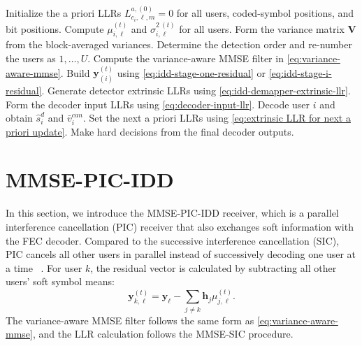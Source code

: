 \begin{algorithm}[t]
\caption{MMSE-SIC-IDD receiver for one coded block}
\label{alg:mmse-sic-idd}
\begin{algorithmic}[1]
\STATE Initialize the a priori LLRs $L^{a,(0)}_{c_i,\ell,m}=0$ for all users, coded-symbol positions, and bit positions.
    \STATE Compute $\mu^{(t)}_{i,\ell}$ and $\sigma^{2~(t)}_{i,\ell}$ for all users.
    \STATE Form the variance matrix $\bm{V}$ from the block-averaged variances.
    \STATE Determine the detection order and re-number the users as $1,\ldots,U$.
        \STATE Compute the variance-aware MMSE filter in \eqref{eq:variance-aware-mmse}.
        \STATE Build $\bm{y}^{(t)}_{(i)}$ using \eqref{eq:idd-stage-one-residual} or \eqref{eq:idd-stage-i-residual}.
        \STATE Generate detector extrinsic LLRs using \eqref{eq:idd-demapper-extrinsic-llr}.
        \STATE Form the decoder input LLRs using \eqref{eq:decoder-input-llr}.
        \STATE Decode user $i$ and obtain $\hat{s}^{d}_{i}$ and $\bar{v}_i^{can}$.
    \ENDFOR
    \STATE Set the next a priori LLRs using \eqref{eq:extrinsic LLR for next a priori update}.
\ENDFOR
\STATE Make hard decisions from the final decoder outputs.
\end{algorithmic}
\end{algorithm}


\section{MMSE-PIC-IDD}
In this section, we introduce the MMSE-PIC-IDD receiver, which is a parallel interference cancellation (PIC) receiver that also exchanges soft information with the FEC decoder.
Compared to the successive interference cancellation (SIC), PIC cancels all other users in parallel instead of successively decoding one user at a time ~\cite{studer2011asic}. For user $k$, the residual vector is calculated by subtracting all other users' soft symbol means: 
\begin{equation}
    \bm{y}^{(t)}_{k,\ell}
    =
    \bm{y}_\ell
    -
    \sum_{j\ne k}\bm{h}_j\mu^{(t)}_{j,\ell}.
    \label{eq:pic-residual}
\end{equation}
The variance-aware MMSE filter follows the same form as \eqref{eq:variance-aware-mmse}, and the LLR calculation follows the MMSE-SIC procedure. 

